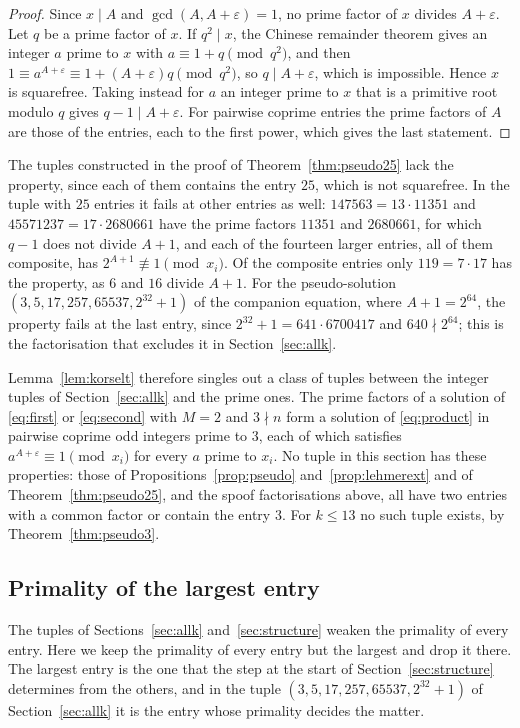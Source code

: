 \documentclass[11pt,reqno]{amsart}
\numberwithin{equation}{section}
\theoremstyle{plain}
\theoremstyle{definition}
\theoremstyle{remark}
\begin{document}
\begin{proof}
Since $x\mid A$ and $\gcd(A,A+\varepsilon)=1$, no prime factor of $x$
divides $A+\varepsilon$. Let $q$ be a prime factor of $x$. If
$q^2\mid x$, the Chinese remainder theorem gives an integer $a$ prime
to $x$ with $a\equiv1+q\pmod{q^2}$, and then
$1\equiv a^{A+\varepsilon}\equiv1+(A+\varepsilon)q\pmod{q^2}$, so
$q\mid A+\varepsilon$, which is impossible. Hence $x$ is squarefree.
Taking instead for $a$ an integer prime to $x$ that is a primitive root
modulo $q$ gives $q-1\mid A+\varepsilon$. For pairwise coprime entries
the prime factors of $A$ are those of the entries, each to the first
power, which gives the last statement.
\end{proof}

The tuples constructed in the proof of Theorem~\ref{thm:pseudo25}
lack the property, since each of them contains the entry $25$, which
is not squarefree. In the tuple with $25$ entries it fails at other
entries as well: $147563=13\cdot11351$ and
$45571237=17\cdot2680661$ have the prime factors $11351$ and
$2680661$, for which $q-1$ does not divide $A+1$, and each of the
fourteen larger entries, all of them composite, has
$2^{A+1}\not\equiv1\pmod{x_i}$. Of the composite entries only
$119=7\cdot17$ has the property, as $6$ and $16$ divide $A+1$. For the
pseudo-solution $(3,5,17,257,65537,2^{32}+1)$ of the companion
equation, where $A+1=2^{64}$, the property fails at the last entry,
since $2^{32}+1=641\cdot6700417$ and $640\nmid2^{64}$; this is the
factorisation that excludes it in Section~\ref{sec:allk}.

Lemma~\ref{lem:korselt} therefore singles out a class of tuples
between the integer tuples of Section~\ref{sec:allk} and the prime
ones. The prime factors of a solution of \eqref{eq:first} or
\eqref{eq:second} with $M=2$ and $3\nmid n$ form a solution of
\eqref{eq:product} in pairwise coprime odd integers prime to $3$, each
of which satisfies $a^{A+\varepsilon}\equiv1\pmod{x_i}$ for every $a$
prime to $x_i$. No tuple in this section has these properties: those
of Propositions~\ref{prop:pseudo} and~\ref{prop:lehmerext} and of
Theorem~\ref{thm:pseudo25}, and the spoof factorisations above, all
have two entries with a common factor or contain the entry $3$. For
$k\le13$ no such tuple exists, by Theorem~\ref{thm:pseudo3}.

\subsection{Primality of the largest entry}\label{sec:largest}
The tuples of Sections~\ref{sec:allk} and~\ref{sec:structure}
weaken the primality of every entry. Here we keep the primality of
every entry but the largest and drop it there. The largest entry is the
one that the step at the start of Section~\ref{sec:structure}
determines from the others, and in the tuple
$(3,5,17,257,65537,2^{32}+1)$ of Section~\ref{sec:allk} it is the entry
whose primality decides the matter.
\end{document}
